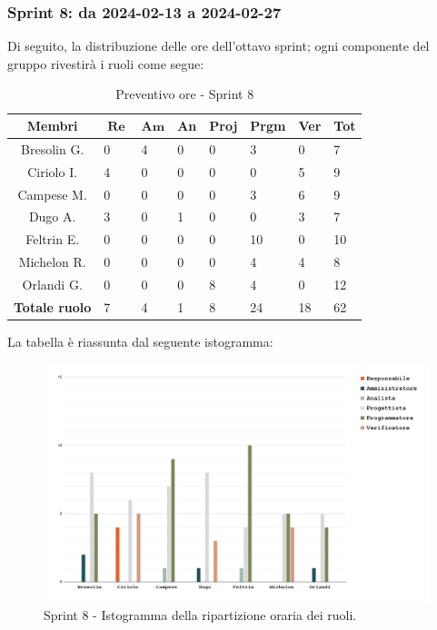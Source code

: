 \documentclass[10pt, a4paper]{article}
\begin{document}
{{{{{{{{{{{{{{{\subsubsection{Sprint 8: da 2024-02-13 a 2024-02-27}
Di seguito, la distribuzione delle ore dell'ottavo sprint; ogni componente del gruppo rivestirà i ruoli come segue:
\begin{table}[H]
\begin{tabularx}{\textwidth}{c|X|X|X|X|X|X|X}
        \textbf{Membri} & $\operatorname{\textbf{Re}}$ & $\mathrm{\textbf{Am}}$ & \textbf{An} & \textbf{Proj} & \textbf{Prgm} & \textbf{Ver} & \textbf{Tot} \\
        \hline Bresolin G. & 0 & \cellcolor{primarycolor}4 & 0 & 0 & 3 & 0 & 7 \\
        \hline Ciriolo I.  & 4 & 0 & 0 & 0 & 0 & \cellcolor{primarycolor}5 & 9 \\
        \hline Campese M.  & 0 & 0 & 0 & 0 & 3 & \cellcolor{primarycolor}6 & 9 \\
        \hline Dugo A.     & \cellcolor{primarycolor}3 & 0 & 1 & 0 & 0 & 3 & 7 \\
        \hline Feltrin E.  & 0 & 0 & 0 & 0 & \cellcolor{primarycolor}10 & 0 & 10 \\
        \hline Michelon R. & 0 & 0 & 0 & 0 & \cellcolor{primarycolor}4 & 4 & 8 \\
        \hline Orlandi G.  & 0 & 0 & 0 & \cellcolor{primarycolor}8 & 4 & 0 & 12 \\
        \hline
        \textbf{Totale ruolo} & 7 & 4 & 1 & 8 & 24 & 18 & 62 
    \end{tabularx}
    \caption{Preventivo ore - Sprint 8}
    \end{table}

La tabella è riassunta dal seguente istogramma:
 \begin{figure}[H]
        \centering        
        \includegraphics[width=15.5cm]{istogrammi/istogramma_8_periodo.png}
        \caption{Sprint 8 - Istogramma della ripartizione oraria dei ruoli. }
    \end{figure}


}}}}}}}}}}}}}}}
\end{document}
